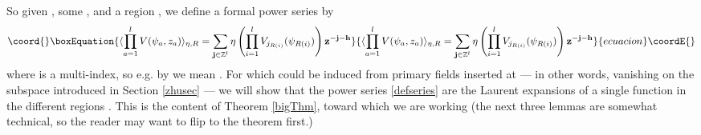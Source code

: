 \documentclass[a4paper,12pt]{article}
\providecommand{\Z}{{\mathbb Z}}
\providecommand{\uu}{{\mathbf u}}
\providecommand{\jj}{{\mathbf j}}
\providecommand{\zz}{{\mathbf z}}
\providecommand{\hh}{{\mathbf h}}
\providecommand{\IP}[1]{\langle#1\rangle}
\begin{document}
So given \myHighlight{$\eta$}\coordHE{}, some \coordHE{}, and a region \coordHE{}, we define a formal power series by
\begin{equation}\coord{}\boxEquation{ \label{defseries}
\IP{\prod_{a=1}^l V(\psi_a, z_a)}_{\eta,R} = \sum_{\jj \in \Z^l} \eta \left( \prod_{i=1}^l V_{j_{R(i)}}(\psi_{R(i)}) \right) \zz^{- \jj - \hh}
}{ \IP{\prod_{a=1}^l V(\psi_a, z_a)}_{\eta,R} = \sum_{\jj \in \Z^l} \eta \left( \prod_{i=1}^l V_{j_{R(i)}}(\psi_{R(i)}) \right) \zz^{- \jj - \hh}
}{ecuacion}\coordE{}\end{equation}
where \myHighlight{$\jj$}\coordHE{} is a multi-index, so e.g. by \myHighlight{$\zz^{-\jj-\hh}$}\coordHE{} we mean \coordHE{}.
For \myHighlight{$\eta$}\coordHE{} which could be induced from primary fields inserted at \myHighlight{$\uu$}\coordHE{} --- in other words, \myHighlight{$\eta$}\coordHE{} vanishing on the
subspace \myHighlight{$O_\uu$}\coordHE{} introduced in Section \ref{zhusec} --- we will show that the power series \eqref{defseries} 
are the Laurent expansions of a single function 
\myHighlight{$\IP{\prod_{a=1}^l V(\psi_a, z_a)}_\eta$}\coordHE{} in the different regions \coordHE{}.  This is the content of Theorem
\ref{bigThm}, toward which we are working (the next three lemmas are somewhat technical, so the reader may
want to flip to the theorem first.)
\end{document}
